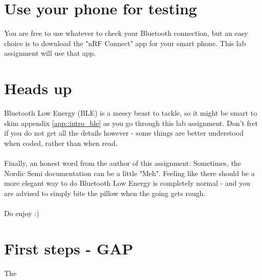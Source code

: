 \documentclass[11pt,a4paper]{article}
\begin{document}
\section{Use your phone for testing}
You are free to use whatever to check your Bluetooth connection, but an easy choice is to download the "nRF Connect" app for your smart phone. This lab assignment will use that app.

\newpage
\noindent
\setcounter{section}{0}
\renewcommand{\thesection}{\arabic{section}}
\renewcommand{\thesubsection}{\arabic{section}.\arabic{subsection}}

\section{Heads up}
Bluetooth Low Energy (BLE) is a messy beast to tackle, so it might be smart to skim appendix \ref{app::intro_ble} as you go through this lab assignment. Don't fret if you do not get all the details however - some things are better understood when coded, rather than when read.\\
\\
Finally, an honest word from the author of this assignment: Sometimes, the Nordic Semi documentation can be a little "Meh". Feeling like there should be a more elegant way to do Bluetooth Low Energy is completely normal - and you are advised to simply bite the pillow when the going gets rough.\\
\\
Do enjoy :)

\section{First steps - GAP}
The 

\newpage
\noindent
\appendix
\end{document}
